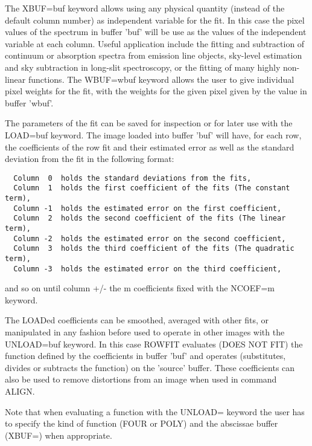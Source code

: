 The XBUF=buf keyword allows using any physical quantity (instead of the
default column number) as independent variable for the fit. In this case
the pixel values of the spectrum in buffer 'buf' will be use as the values
of the independent variable at each column. Useful application include the
fitting and subtraction of continuum or absorption spectra from emission
line objects, sky-level estimation and sky subtraction in long-slit
spectroscopy, or the fitting of many highly non-linear functions. The
WBUF=wbuf keyword allows the user to give individual pixel weights for the
fit, with the weights for the given pixel given by the value in buffer
'wbuf'.

The parameters of the fit can be saved for inspection or for later use with
the LOAD=buf keyword. The image loaded into buffer 'buf' will have, for
each row, the coefficients of the row fit and their estimated error as
well as the standard deviation from the fit in the following format:
\begin{verbatim}
  Column  0  holds the standard deviations from the fits,
  Column  1  holds the first coefficient of the fits (The constant term),
  Column -1  holds the estimated error on the first coefficient,
  Column  2  holds the second coefficient of the fits (The linear term),
  Column -2  holds the estimated error on the second coefficient,
  Column  3  holds the third coefficient of the fits (The quadratic term),
  Column -3  holds the estimated error on the third coefficient,
\end{verbatim}
and so on until column +/- the m coefficients fixed with the NCOEF=m
keyword.

The LOADed coefficients can be smoothed, averaged with other fits, or
manipulated in any fashion before used to operate in other images with the
UNLOAD=buf keyword. In this case ROWFIT evaluates (DOES NOT FIT) the
function defined by the coefficients in buffer 'buf' and operates
(substitutes, divides or subtracts the function) on the 'source'
buffer. These coefficients can also be used to remove distortions from an
image when used in command ALIGN.

Note that when evaluating a function with the UNLOAD= keyword the user has
to specify the kind of function (FOUR or POLY) and the abscissae buffer
(XBUF=) when appropriate.

